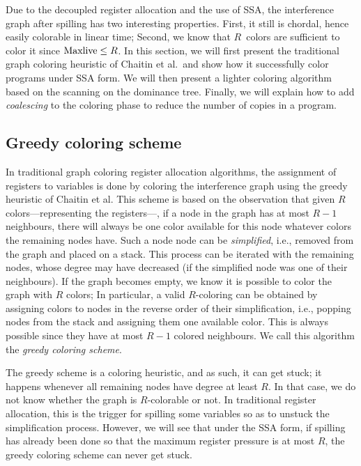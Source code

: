 {Due to the decoupled register allocation and the use of SSA, the interference graph after spilling has two interesting properties.
First, it still is chordal, hence easily colorable in linear time;
Second, we know that $R$~colors are sufficient to color it since $\mathrm{Maxlive} \leq R$.
In this section, we will first present the traditional graph coloring heuristic of Chaitin et al.\ and show how it successfully color programs under SSA form.
We will then present a lighter coloring algorithm based on the scanning on the dominance tree.
Finally, we will explain how to add \emph{coalescing} to the coloring phase to reduce the number of copies in a program.

 

\subsection{Greedy coloring scheme}
\label{sec:regalloc:greedy-col}

In traditional graph coloring register allocation algorithms, the assignment of registers to variables is done by coloring the interference graph using the greedy heuristic of Chaitin et al.
This scheme is based on the observation that given $R$ colors---representing the registers---, if a node in the graph has at most $R-1$ neighbours, there will always be one color available for this node whatever colors the remaining nodes have.
Such a node node can be \emph{simplified}, i.e., removed from the graph and placed on a stack.
This process can be iterated with the remaining nodes, whose degree may have decreased (if the simplified node was one of their neighbours).
If the graph becomes empty, we know it is possible to color the graph with $R$ colors; 
In particular, a valid $R$-coloring can be obtained by assigning colors to nodes in the reverse order of their simplification,
i.e., popping nodes from the stack and assigning them one available color.
This is always possible since they have at most $R-1$ colored neighbours.
We call this algorithm the \emph{greedy coloring scheme}.

The greedy scheme is a coloring heuristic, and as such, it can get stuck;
it happens whenever all remaining nodes have degree at least $R$.
In that case, we do not know whether the graph is $R$-colorable or not.
In traditional register allocation, this is the trigger for spilling some variables so as to unstuck the simplification process.
However, we will see that under the SSA form, if spilling has already been done so that the maximum register pressure is at most $R$, the greedy coloring scheme can never get stuck.

}
